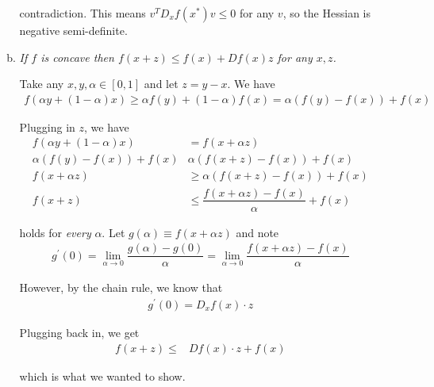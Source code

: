 \documentclass{article}
\begin{document}
\begin{enumerate}[1.]
\begin{enumerate}[a)]
        contradiction. This means $v^T D_x f(x^*) v \le 0$ for any $v$, so the Hessian is negative semi-definite.

      \item \textit{If $f$ is concave then $f(x + z) \le f(x) + Df(x) z$ for any $x, z$.}

        \solution Take any $x, y, \alpha \in [0, 1]$ and let $z = y - x$. We have
          \begin{align*}
            f(\alpha y + (1 - \alpha) x)
            \ge
            \alpha f(y) + (1 - \alpha) f(x)
            =
            \alpha (f(y) - f(x)) + f(x)
          \end{align*}

          Plugging in $z$, we have
          \begin{align*}
            f(\alpha y + (1 - \alpha) x)
            & = f(x + \alpha z)
            \\
            \alpha (f(y) - f(x)) + f(x)
            &
            \alpha (f(x + z) - f(x)) + f(x)
            \\
            f(x + \alpha z)
            &
            \ge
            \alpha (f(x + z) - f(x)) + f(x)
            \\
            f(x + z)
            &
            \le
            \dfrac{f(x + \alpha z) - f(x)}{\alpha} + f(x)
          \end{align*}

          holds for \textit{every} $\alpha$. Let $g(\alpha) \equiv f(x + \alpha z)$ and note
          \begin{align*}
            g^\prime(0)
            =
            \lim_{\alpha \to 0} 
            \dfrac{g(\alpha) - g(0)}{\alpha}
            =
            \lim_{\alpha \to 0} 
            \dfrac{f(x + \alpha z) - f(x)}{\alpha}
          \end{align*}

          However, by the chain rule, we know that
          \begin{align*}
            g^\prime(0)
            =
            D_x f(x) \cdot z
          \end{align*}

          Plugging back in, we get
          \begin{align*}
            f(x + z)
            \le
            &
            D f(x) \cdot z + f(x)
          \end{align*}

          which is what we wanted to show.


\end{enumerate}
\end{enumerate}
\end{document}
